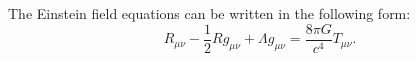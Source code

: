 \documentclass{article}
\begin{document}
The Einstein field equations can be written in the following form:
\begin{equation}
  R_{\mu\nu} - \frac{1}{2} R g_{\mu\nu} + \Lambda g_{\mu\nu}
    = \frac{8\pi G}{c^4} T_{\mu\nu} .
\end{equation}
\end{document}
